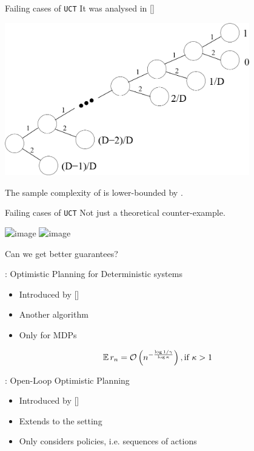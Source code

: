 \documentclass{beamer}
\begin{document}
\begin{frame}{Failing cases of \texttt{UCT}}
    It was analysed in [\cite{Coquelin2007}]
    \begin{center}
    \includegraphics[width=0.8\textwidth]{img/uct_fail}
    \end{center}
    The sample complexity of is lower-bounded by .
\end{frame}

\begin{frame}{Failing cases of \texttt{UCT}}
    Not just a theoretical counter-example.
    \begin{center}
    \includegraphics<1>[width=0.8\textwidth]{img/uct_trap}
    \includegraphics<2>[width=0.8\textwidth]{img/uct_trap_2}
    \\ \bigskip
    
    \end{center}
\end{frame}

\begin{frame}{Can we get better guarantees?}
    \begin{block}{\OPD: Optimistic Planning for Deterministic systems}
    \begin{itemize}
        \item Introduced by [\cite{Hren2008}]
        \item Another  algorithm
        \item Only for  MDPs
    \end{itemize}
    \end{block}
    \begin{theorem}
    \begin{equation*}
    \expectedvalue r_n = 
      \cO\left(n^{-\frac{\log 1/\gamma}{\log \kappa}}\right), \text{if}\ \kappa > 1 
    \end{equation*}
    \end{theorem}
    \pause
\begin{block}{\OLOP: Open-Loop Optimistic Planning}
    \begin{itemize}
        \item Introduced by [\cite{Bubeck2010}]
        \item Extends \OPD to the  setting
        \item Only considers  policies, i.e. sequences of actions
    \end{itemize}
    \end{block}
\end{frame}
\end{document}
